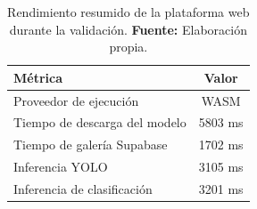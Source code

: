 \begin{table}[H]
\centering
\caption{Rendimiento resumido de la plataforma web durante la validación. \textbf{Fuente:} Elaboración propia.}
\label{tab:resumen-web-rendimiento}
\begin{tabular}{lc}
\toprule
\textbf{Métrica} & \textbf{Valor} \\
\midrule
Proveedor de ejecución & WASM \\
Tiempo de descarga del modelo & 5803 ms \\
Tiempo de galería Supabase & 1702 ms \\
Inferencia YOLO & 3105 ms \\
Inferencia de clasificación & 3201 ms \\
\bottomrule
\end{tabular}
\end{table}
